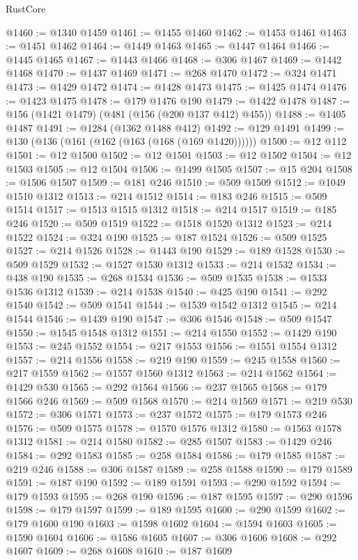 \begin{lexlean}{RustCore}
\begin{coremodule}
@1460 := @1340 @1459
@1461 := @1455 @1460
@1462 := @1453 @1461
@1463 := @1451 @1462
@1464 := @1449 @1463
@1465 := @1447 @1464
@1466 := @1445 @1465
@1467 := @1443 @1466
@1468 := @306 @1467
@1469 := @1442 @1468
@1470 := @1437 @1469
@1471 := @268 @1470
@1472 := @324 @1471
@1473 := @1429 @1472
@1474 := @1428 @1473
@1475 := @1425 @1474
@1476 := @1423 @1475
@1478 := @179 @1476 @190
@1479 := @1422 @1478
@1487 := @156 (@1421 @1479) (@481 (@156 (@200 @137 @412) @455))
@1488 := @1405 @1487
@1491 := @1284 (@1362 @1488 @412)
@1492 := @129 @1491
@1499 := @130 (@136 (@161 (@162 (@163 (@168 (@169 @1420))))))
@1500 := @12 @112
@1501 := @12 @1500
@1502 := @12 @1501
@1503 := @12 @1502
@1504 := @12 @1503
@1505 := @12 @1504
@1506 := @1499 @1505
@1507 := @15 @204
@1508 := @1506 @1507
@1509 := @181 @246
@1510 := @509 @1509
@1512 := @1049 @1510 @1312
@1513 := @214 @1512
@1514 := @183 @246
@1515 := @509 @1514
@1517 := @1513 @1515 @1312
@1518 := @214 @1517
@1519 := @185 @246
@1520 := @509 @1519
@1522 := @1518 @1520 @1312
@1523 := @214 @1522
@1524 := @324 @190
@1525 := @187 @1524
@1526 := @509 @1525
@1527 := @214 @1526
@1528 := @1443 @190
@1529 := @189 @1528
@1530 := @509 @1529
@1532 := @1527 @1530 @1312
@1533 := @214 @1532
@1534 := @438 @190
@1535 := @268 @1534
@1536 := @509 @1535
@1538 := @1533 @1536 @1312
@1539 := @214 @1538
@1540 := @425 @190
@1541 := @292 @1540
@1542 := @509 @1541
@1544 := @1539 @1542 @1312
@1545 := @214 @1544
@1546 := @1439 @190
@1547 := @306 @1546
@1548 := @509 @1547
@1550 := @1545 @1548 @1312
@1551 := @214 @1550
@1552 := @1429 @190
@1553 := @245 @1552
@1554 := @217 @1553
@1556 := @1551 @1554 @1312
@1557 := @214 @1556
@1558 := @219 @190
@1559 := @245 @1558
@1560 := @217 @1559
@1562 := @1557 @1560 @1312
@1563 := @214 @1562
@1564 := @1429 @530
@1565 := @292 @1564
@1566 := @237 @1565
@1568 := @179 @1566 @246
@1569 := @509 @1568
@1570 := @214 @1569
@1571 := @219 @530
@1572 := @306 @1571
@1573 := @237 @1572
@1575 := @179 @1573 @246
@1576 := @509 @1575
@1578 := @1570 @1576 @1312
@1580 := @1563 @1578 @1312
@1581 := @214 @1580
@1582 := @285 @1507
@1583 := @1429 @246
@1584 := @292 @1583
@1585 := @258 @1584
@1586 := @179 @1585
@1587 := @219 @246
@1588 := @306 @1587
@1589 := @258 @1588
@1590 := @179 @1589
@1591 := @187 @190
@1592 := @189 @1591
@1593 := @290 @1592
@1594 := @179 @1593
@1595 := @268 @190
@1596 := @187 @1595
@1597 := @290 @1596
@1598 := @179 @1597
@1599 := @189 @1595
@1600 := @290 @1599
@1602 := @179 @1600 @190
@1603 := @1598 @1602
@1604 := @1594 @1603
@1605 := @1590 @1604
@1606 := @1586 @1605
@1607 := @306 @1606
@1608 := @292 @1607
@1609 := @268 @1608
@1610 := @187 @1609

\end{coremodule}
\end{lexlean}
